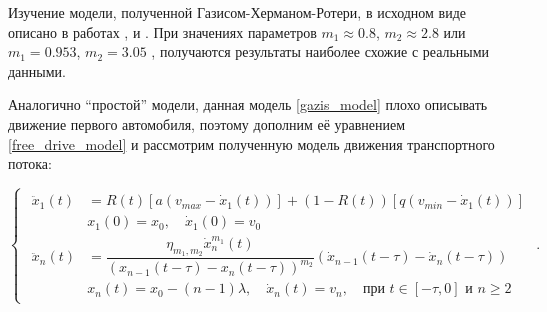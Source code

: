 \documentclass[12pt, a4paper]{extarticle}
\numberwithin{equation}{section}
\numberwithin{figure}{section}
\begin{document}
Изучение модели, полученной Газисом-Херманом-Ротери, в исходном виде описано в работах \cite{StudyingGazisModel_1},  \cite{StudyingGazisModel_2} и  \cite{StudyingGazisModel_3}. При значениях параметров $m_1 \approx 0.8$, $m_2 \approx 2.8$ \cite{StudyingGazisModel_1} или $m_1 = 0.953$, $m_2 = 3.05$ \cite{StudyingGazisModel_2}, \cite{StudyingGazisModel_3} получаются результаты наиболее схожие с реальными данными.

Аналогично ``простой'' модели, данная модель \eqref{gazis_model} плохо описывать движение первого автомобиля, поэтому дополним её уравнением \eqref{free_drive_model} и рассмотрим полученную модель движения транспортного потока:

\begin{equation} \label{full_gazis_model}
\begin{cases}
\begin{split}
\ddot{x}_1(t)& = R(t) \left[ a\left(v_{max}-\dot{x}_1(t) \right)\right] + (1-R(t)) \left[ q\left( v_{min} - \dot{x}_1(t)\right) \right] \\
&x_{1}(0)=x_0, \quad \dot{x}_{1}(0)=v_{0}\\
\ddot{x}_n(t)& = \dfrac{\eta_{m_1,m_2}\dot{x}_n^{m_1}(t)}{(x_{n-1}(t-\tau)-x_n(t-\tau))^{m_2}} (\dot{x}_{n-1}(t-\tau) - \dot{x}_{n}(t-\tau)) \\
&x_n(t)=x_0-(n-1)\lambda, \quad \dot{x}_n(t)=v_{n}, \quad \text{при } t \in [-\tau,0] \text{ и } n\geq2
\end{split}
\end{cases}.
\end{equation}
\end{document}
